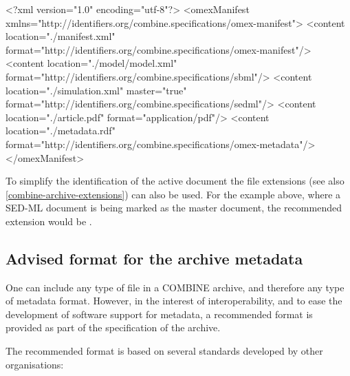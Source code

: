 \begin{example}
<?xml version="1.0" encoding="utf-8"?>
<omexManifest xmlns="http://identifiers.org/combine.specifications/omex-manifest">
    <content location="./manifest.xml" 
		         format="http://identifiers.org/combine.specifications/omex-manifest"/>
    <content location="./model/model.xml" 
		         format="http://identifiers.org/combine.specifications/sbml"/>
    <content location="./simulation.xml" master="true"
		         format="http://identifiers.org/combine.specifications/sedml"/>
    <content location="./article.pdf" 
		         format="application/pdf"/>
    <content location="./metadata.rdf" 
		         format="http://identifiers.org/combine.specifications/omex-metadata"/>
</omexManifest>
\end{example}

To simplify the identification of the active document the file extensions 
(see also \ref{combine-archive-extensions}) can also be used. For the example above, 
where a SED-ML document is being marked as the master document, the 
recommended extension would be . 

\subsection{Advised format for the archive metadata}

One can include any type of file in a COMBINE archive, and therefore any 
type of metadata format. However, in the interest of interoperability, 
and to ease the development of software support for metadata, a 
recommended format is provided as part of the specification of the 
archive. 

The recommended format is based on several standards developed by other 
organisations: 

